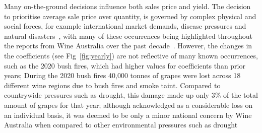 \documentclass[10pt,letterpaper]{article}
\begin{document}
Many on-the-ground decisions influence both sales price and yield. The decision to prioritise average sale price over quantity, is governed by complex physical and social forces, for example international market demands, disease pressures and natural disasters~\cite{abadCoverCropsViticulture2021,cortezUsingDataMining2009,hallWithinseasonTemporalVariation2011,i.goodwinManagingSoilWater2009,kasimatiPredictingGrapeSugar2022,oliverReviewSoilPhysical2013,srivastavaNondestructiveSensingMethods2018}, with many of these occurrences being highlighted throughout the reports from Wine Australia over the past decade~\cite{wineaustraliaNationalVintageReport2019,wineaustraliaNationalVintageReport2021,wineaustraliaNationalVintageReport2022,winemakersfederationofaustraliaNationalVintageReport2013,winemakersfederationofaustraliaNationalVintageReport2014,winemakersfederationofaustraliaNationalVintageReport2015,winemakersfederationofaustraliaNationalVintageReport2016,winemakersfederationofaustraliaNationalVintageReport2017,winemakersfederationofaustraliaNationalVintageReport2018}. However, the changes in the coefficients (see Fig~\ref{fig:yearly}) are not reflective of many known occurrences, such as the 2020 bush fires, which had higher values for coefficients than prior years; During the 2020 bush fires 40,000 tonnes of grapes were lost across 18 different wine regions due to bush fires and smoke taint. Compared to countrywide pressures such as drought, this damage made up only 3\% of the total amount of grapes for that year; although acknowledged as a considerable loss on an individual basis, it was deemed to be only a minor national concern by Wine Australia when compared to other environmental pressures such as drought~\cite{wineaustraliaNationalVintageReport2020}
\par
\end{document}
